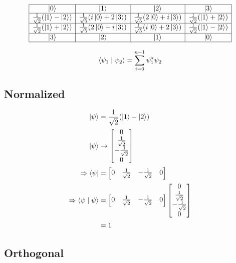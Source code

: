$$
\begin{array}{|c|c|c|c|}
  \hline
  \ket{0} & \ket{1} & \ket{2} & \ket{3} \\
  \hline
  \frac{1}{\sqrt{2}}(\ket{1}-\ket{2}) & \frac{1}{\sqrt{5}}(i\ket{0}+2\ket{3}) & \frac{1}{\sqrt{5}}(2\ket{0}+i\ket{3}) & \frac{1}{\sqrt{2}}(\ket{1}+\ket{2}) \\
  \hline
  \frac{1}{\sqrt{2}}(\ket{1}+\ket{2}) & \frac{1}{\sqrt{5}}(2\ket{0}+i\ket{3}) & \frac{1}{\sqrt{5}}(i\ket{0}+2\ket{3}) & \frac{1}{\sqrt{2}}(\ket{1}-\ket{2}) \\
  \hline
  \ket{3} & \ket{2} & \ket{1} & \ket{0} \\
  \hline
\end{array}
$$ 


$$
\braket{\psi_1 \mid \psi_2} = \sum_{i=0}^{n-1} \psi_1^* \psi_2
$$

\subsection{Normalized}

\begin{align}
\ket{\psi} &= \frac{1}{\sqrt{2}}(\ket{1}-\ket{2}) \\
\ket{\psi} &\rightarrow \begin{bmatrix} 0 \\ \frac{1}{\sqrt{2}} \\ -\frac{1}{\sqrt{2}} \\ 0 \end{bmatrix} \\
\Rightarrow \bra{\psi} &= \begin{bmatrix} 0 & \frac{1}{\sqrt{2}} & -\frac{1}{\sqrt{2}} & 0 \end{bmatrix} \\
\Rightarrow \braket{\psi \mid \psi} &= \begin{bmatrix} 0 & \frac{1}{\sqrt{2}} & -\frac{1}{\sqrt{2}} & 0 \end{bmatrix} \begin{bmatrix} 0 \\ \frac{1}{\sqrt{2}} \\ -\frac{1}{\sqrt{2}} \\ 0 \end{bmatrix} \\
&= 1
\end{align}



\subsection{Orthogonal}

